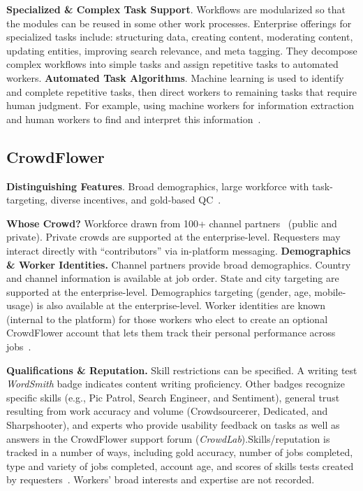 \documentclass{sigchi}
\begin{document}
{\bf Specialized \& Complex Task Support}. Workflows are modularized so that the modules can be reused in some other work processes. Enterprise offerings for specialized tasks include: structuring data, creating content, moderating content, updating entities, improving search relevance, and meta tagging. They decompose complex workflows into simple tasks and assign repetitive tasks to automated workers. 
{\bf Automated Task Algorithms}. Machine learning is used to identify and complete repetitive tasks, then direct workers to remaining tasks that require human judgment. For example, using machine workers for information extraction and human workers to find and interpret this information~\cite{CCSBlog}.  



\subsection{CrowdFlower}

{\bf Distinguishing Features}. Broad demographics, large workforce with task-targeting, diverse incentives, and gold-based QC~\cite{Le10,Oleson11}.

{\bf Whose Crowd?} Workforce drawn from 100+ channel partners~\cite{cf-josephy13} (public and private). Private crowds are supported at the enterprise-level. Requesters may interact directly with ``contributors'' via in-platform messaging.  
{\bf Demographics \& Worker Identities.} Channel partners provide broad demographics. Country and channel information is available at job order. State and city targeting are supported at the enterprise-level. Demographics targeting  (gender, age, mobile-usage) is also available at the enterprise-level. Worker identities are known (internal to the platform) for those workers who elect to create an optional CrowdFlower account that lets them track their personal performance across jobs~\cite{cf-josephy13}.


{\bf Qualifications \& Reputation.} Skill restrictions can be specified. A writing test {\em WordSmith} badge indicates content writing proficiency. Other badges recognize specific skills (e.g., Pic Patrol, Search Engineer, and Sentiment), general trust resulting from work accuracy and volume
(Crowdsourcerer, Dedicated, and Sharpshooter), and experts who provide usability feedback on tasks as well as answers in the CrowdFlower support forum
({\em CrowdLab}).Skills/reputation is tracked in a number of ways, including gold accuracy, number of jobs completed, type and variety of jobs completed, account age, and scores of skills tests created by requesters~\cite{cf-josephy13}. Workers' broad interests and expertise are not recorded. 
\end{document}
